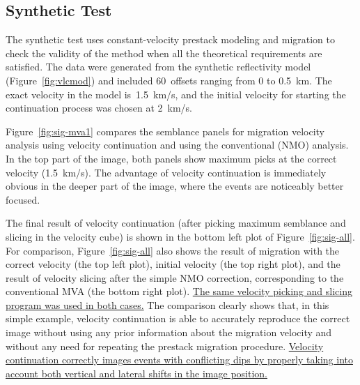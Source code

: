 \subsection{Synthetic Test}

The synthetic test uses constant-velocity prestack modeling and migration to
check the validity of the method when all the theoretical requirements are
satisfied. The data were generated from the synthetic reflectivity model
(Figure~\ref{fig:vlcmod}) and included 60~offsets ranging from 0 to 0.5~km.
The exact velocity in the model is~1.5~km/s, and the initial velocity for
starting the continuation process was chosen at 2~km/s.


Figure~\ref{fig:sig-mva1} compares the semblance panels for migration
velocity analysis using velocity continuation and using the
conventional (NMO) analysis. In the top part of the image, both panels
show maximum picks at the correct velocity (1.5~km/s).  The advantage
of velocity continuation is immediately obvious in the deeper part of
the image, where the events are noticeably better focused.


The final result of velocity continuation (after picking maximum semblance and
slicing in the velocity cube) is shown in the bottom left plot of
Figure~\ref{fig:sig-all}. For comparison, Figure~\ref{fig:sig-all} also shows
the result of migration with the correct velocity (the top left plot), initial
velocity (the top right plot), and the result of velocity slicing after the
simple NMO correction, corresponding to the conventional MVA (the bottom right
plot). \uline{The same velocity picking and slicing program was used in both cases.}
The comparison clearly shows that, in this simple example, velocity
continuation is able to accurately reproduce the correct image without using
any prior information about the migration velocity and without any need for
repeating the prestack migration procedure. \uline{Velocity continuation correctly
images events with conflicting dips by properly taking into account both
vertical and lateral shifts in the image position.}

